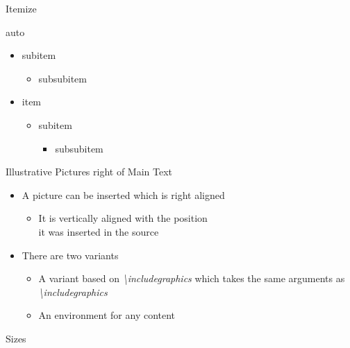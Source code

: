\documentclass[english,aspectratio=43,t]{beamer}
\begin{document}
\begin{frame}{Itemize}
\begin{cols}{auto}
\begin{whiteblock}{}
\begin{itemize}
\begin{itemize}
				\item subitem
					\begin{itemize}
					\item subsubitem
					\end{itemize}
				\end{itemize}
			\end{itemize}
		\end{whiteblock}
		\begin{grayblock}{}
			\begin{itemize}
			\item item
				\begin{itemize}
				\item subitem
					\begin{itemize}
					\item subsubitem
					\end{itemize}
				\end{itemize}
			\end{itemize}
		\end{grayblock}
	\end{cols}
\end{frame}

\begin{frame}{Illustrative Pictures right of Main Text}
	\begin{itemize}
	\item A picture can be inserted which is right aligned
		\begin{itemize}
		\item It is vertically aligned with the position
		\\it was inserted in the source
		\end{itemize}
	\item There are two variants
		\begin{itemize}
		\item A variant based on \textit{{\textbackslash}includegraphics} which takes the same arguments as \textit{{\textbackslash}includegraphics}
		\item An environment for any content
		\begin{illustration}
		\end{illustration}
		\end{itemize}
	\end{itemize}
\end{frame}


\begin{frame}{Sizes}%
	\showsizes[cm]%
	\showfonts
\end{frame}
\end{document}
